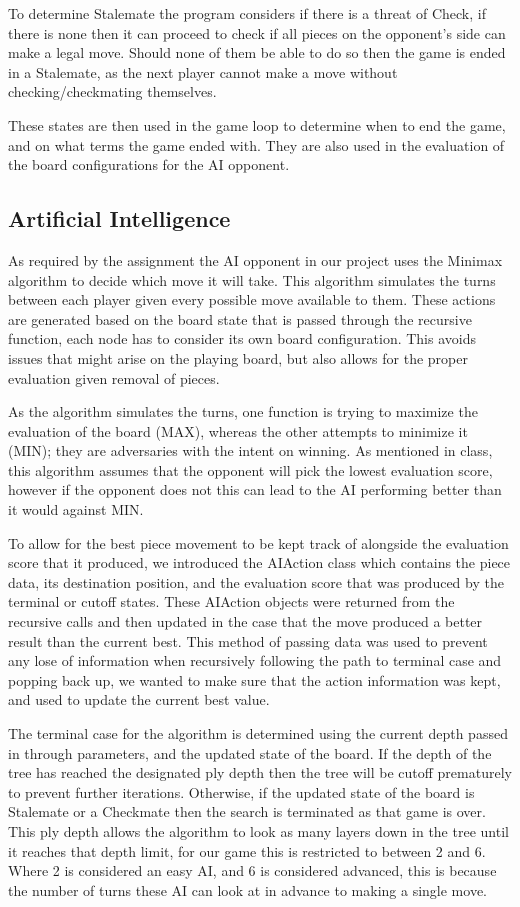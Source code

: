 \documentclass[conference]{IEEEtran}
\begin{document}
To determine Stalemate the program considers if there is a threat of Check, if there is none then it can proceed to check if all pieces on the opponent's side can make a legal move. Should none of them be able to do so then the game is ended in a Stalemate, as the next player cannot make a move without checking/checkmating themselves.

These states are then used in the game loop to determine when to end the game, and on what terms the game ended with. They are also used in the evaluation of the board configurations for the AI opponent. 

\subsection{Artificial Intelligence}
As required by the assignment the AI opponent in our project uses the Minimax algorithm to decide which move it will take. This algorithm simulates the turns between each player given every possible move available to them. These actions are generated based on the board state that is passed through the recursive function, each node has to consider its own board configuration. This avoids issues that might arise on the playing board, but also allows for the proper evaluation given removal of pieces. 

As the algorithm simulates the turns, one function is trying to maximize the evaluation of the board (MAX), whereas the other attempts to minimize it (MIN); they are adversaries with the intent on winning. As mentioned in class, this algorithm assumes that the opponent will pick the lowest evaluation score, however if the opponent does not this can lead to the AI performing better than it would against MIN.

To allow for the best piece movement to be kept track of alongside the evaluation score that it produced, we introduced the AIAction class which contains the piece data, its destination position, and the evaluation score that was produced by the terminal or cutoff states. These AIAction objects were returned from the recursive calls and then updated in the case that the move produced a better result than the current best. This method of passing data was used to prevent any lose of information when recursively following the path to terminal case and popping back up, we wanted to make sure that the action information was kept, and used to update the current best value. 

The terminal case for the algorithm is determined using the current depth passed in through parameters, and the updated state of the board. If the depth of the tree has reached the designated ply depth then the tree will be cutoff prematurely to prevent further iterations. Otherwise, if the updated state of the board is Stalemate or a Checkmate then the search is terminated as that game is over. This ply depth allows the algorithm to look as many layers down in the tree until it reaches that depth limit, for our game this is restricted to between 2 and 6. Where 2 is considered an easy AI, and 6 is considered advanced, this is because the number of turns these AI can look at in advance to making a single move.
\end{document}
